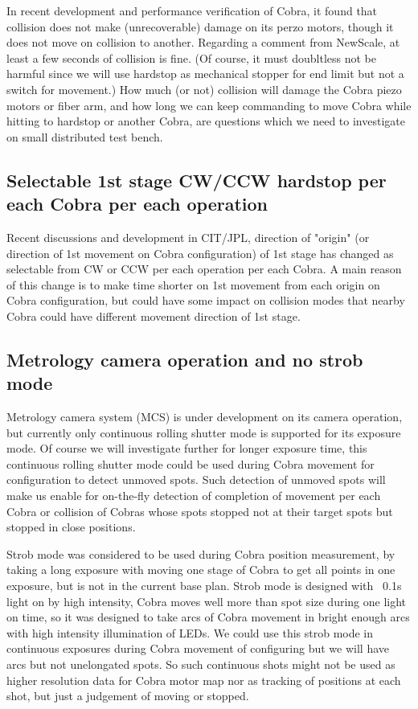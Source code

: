 \documentclass[a4paper,notitlepage]{article}
\begin{document}
In recent development and performance verification of Cobra, it found that 
collision does not make (unrecoverable) damage on its perzo motors, though 
it does not move on collision to another. Regarding a comment from NewScale, 
at least a few seconds of collision is fine. (Of course, it must doubltless 
not be harmful since we will use hardstop as mechanical stopper for end limit 
but not a switch for movement.) How much (or not) collision will damage the 
Cobra piezo motors or fiber arm, and how long we can keep commanding to move 
Cobra while hitting to hardstop or another Cobra, are questions which we 
need to investigate on small distributed test bench.

\subsection{Selectable 1st stage CW/CCW hardstop per each Cobra per each operation}

Recent discussions and development in CIT/JPL, direction of "origin" (or 
direction of 1st movement on Cobra configuration) of 1st stage has changed 
as selectable from CW or CCW per each operation per each Cobra. A main reason 
of this change is to make time shorter on 1st movement from each origin on 
Cobra configuration, but could have some impact on collision modes that 
nearby Cobra could have different movement direction of 1st stage. 

\subsection{Metrology camera operation and no strob mode}

Metrology camera system (MCS) is under development on its camera operation, 
but currently only continuous rolling shutter mode is supported for its 
exposure mode. Of course we will investigate further for longer exposure 
time, this continuous rolling shutter mode could be used during Cobra 
movement for configuration to detect unmoved spots. Such detection of 
unmoved spots will make us enable for on-the-fly detection of completion 
of movement per each Cobra or collision of Cobras whose spots stopped not 
at their target spots but stopped in close positions. 

Strob mode was considered to be used during Cobra position measurement, by 
taking a long exposure with moving one stage of Cobra to get all points in 
one exposure, but is not in the current base plan. Strob mode is designed 
with ~0.1s light on by high intensity, Cobra moves well more than spot size 
during one light on time, so it was designed to take arcs of Cobra movement 
in bright enough arcs with high intensity illumination of LEDs. We could use 
this strob mode in continuous exposures during Cobra movement of configuring 
but we will have arcs but not unelongated spots. So such continuous shots 
might not be used as higher resolution data for Cobra motor map nor as 
tracking of positions at each shot, but just a judgement of moving or stopped.
\end{document}
